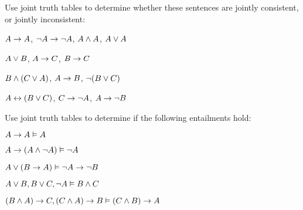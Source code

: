 \problempart
Use joint truth tables to determine whether these sentences are jointly consistent, or jointly inconsistent:
\begin{earg}
\item $A\rightarrow A$, $\neg A \rightarrow \neg A$, $A\wedge A$, $A\vee A$ %
\item $A\vee B$, $A\rightarrow C$, $B\rightarrow C$ %
\item $B\wedge(C\vee A)$, $A\rightarrow B$, $\neg(B\vee C)$  %
\item $A\leftrightarrow(B\vee C)$, $C\rightarrow \neg A$, $A\rightarrow \neg B$ %
\end{earg}

\problempart
Use joint truth tables to determine if the following entailments hold:
\begin{earg}
\item $A\rightarrow A \vDash A$ %
\item $A\rightarrow(A\wedge\neg A) \vDash \neg A$ %
\item $A\vee(B\rightarrow A) \vDash \neg A \rightarrow \neg B$ %
\item $A\vee B, B\vee C, \neg A \vDash B \wedge C$ %
\item $(B\wedge A)\rightarrow C, (C\wedge A)\rightarrow B \vDash (C\wedge B)\rightarrow A$ %
\end{earg}


